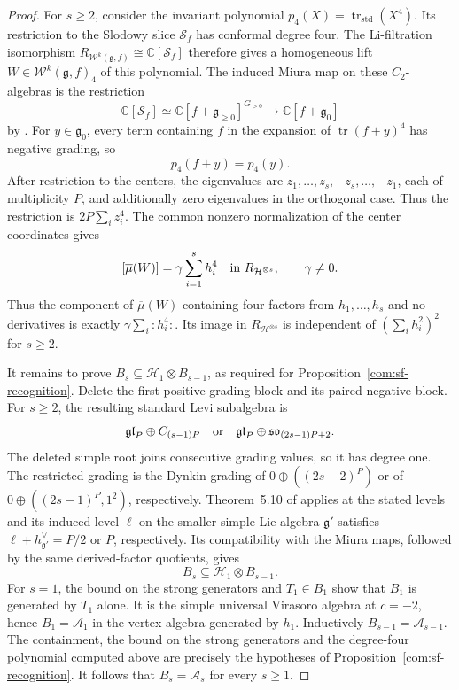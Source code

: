 \documentclass[11pt,a4paper]{amsart}
\numberwithin{equation}{section}
\theoremstyle{definition}
\theoremstyle{remark}
\newcommand{\C}{\mathbb C}
\newcommand{\g}{\mathfrak g}
\newcommand{\sog}{\mathfrak{so}}
\newcommand{\glg}{\mathfrak{gl}}
\begin{document}
\begin{proof}
For $s\ge2$, consider the invariant polynomial
$p_4(X)=\operatorname{tr}_{\mathrm{std}}(X^4)$.
Its restriction to the Slodowy slice $\mathcal S_f$ has conformal
degree four. The Li-filtration isomorphism
$R_{\mathcal W^k(\g,f)}\cong\C[\mathcal S_f]$ therefore gives
a homogeneous lift $W\in\mathcal W^k(\g,f)_4$ of this polynomial.
The induced Miura map on these $C_2$-algebras is the restriction
$$
 \C[\mathcal S_f]\simeq
 \C[f+\g_{\ge0}]^{G_{>0}}
 \longrightarrow\C[f+\g_0]
$$
by \cite[Proposition~2.8 and Section~2.5, equation~(2.8)]{NakatsukaMiura}.
For $y\in\g_0$, every term containing $f$ in the expansion of
$\operatorname{tr}(f+y)^4$ has negative grading, so
$$
 p_4(f+y)=p_4(y).
$$
After restriction to the centers, the eigenvalues are
$z_1,\ldots,z_s,-z_s,\ldots,-z_1$, each of multiplicity $P$,
and additionally zero eigenvalues in the orthogonal case. Thus the
restriction is $2P\sum_i z_i^4$. The common nonzero normalization
of the center coordinates gives
$$
 [\overline\mu(W)]=\gamma\sum_{i=1}^s h_i^4
 \quad\hbox{in }R_{\mathcal H^{\otimes s}},\qquad \gamma\ne0.
$$
Thus the component of $\overline\mu(W)$ containing four factors from $h_1,\ldots,h_s$ and no derivatives is exactly
$\gamma\sum_i:h_i^4:$. Its image in $R_{\mathcal H^{\otimes s}}$
is independent of $(\sum_i h_i^2)^2$ for $s\ge2$.

It remains to prove $B_s\subseteq\mathcal H_1\otimes B_{s-1}$,
as required for Proposition~\ref{com:sf-recognition}. Delete the first positive
grading block and its paired negative block. For $s\ge2$, the
resulting standard Levi subalgebra is
$$
 \glg_P\oplus C_{(s-1)P}
 \quad\hbox{or}\quad
 \glg_P\oplus\sog_{(2s-1)P+2}.
$$
The deleted simple root joins consecutive grading values, so it
has degree one. The restricted grading is the Dynkin grading of
$0\oplus((2s-2)^P)$ or of
$0\oplus((2s-1)^P,1^2)$, respectively.
Theorem~5.10 of \cite{Genra} applies at the stated levels and its
induced level $\ell$ on the smaller simple Lie algebra $\g'$
satisfies $\ell+h^\vee_{\g'}=P/2$ or $P$, respectively. Its compatibility with the Miura maps,
followed by the same derived-factor quotients, gives
$$
 B_s\subseteq\mathcal H_1\otimes B_{s-1}.
$$
For $s=1$, the bound on the strong generators and $T_1\in B_1$ show that
$B_1$ is generated by $T_1$ alone. It is the simple universal
Virasoro algebra at $c=-2$, hence $B_1=\mathcal A_1$ in the vertex algebra generated by $h_1$.
Inductively $B_{s-1}=\mathcal A_{s-1}$. The containment, the
bound on the strong generators and the degree-four polynomial computed above
are precisely the hypotheses of Proposition~\ref{com:sf-recognition}.
It follows that $B_s=\mathcal A_s$ for every $s\ge1$.
\end{proof}
\end{document}
